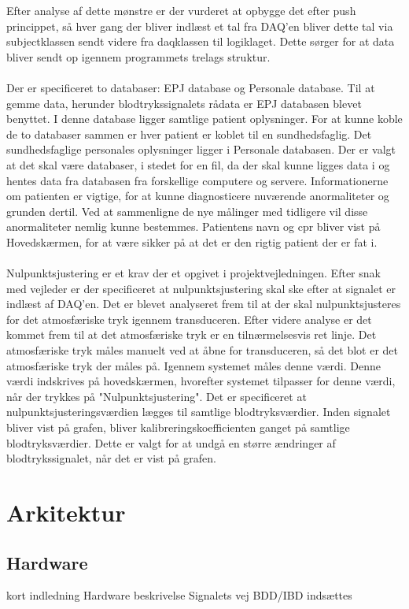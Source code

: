 Efter analyse af dette mønstre er der vurderet at opbygge det efter push princippet, så hver gang der bliver indlæst et tal fra DAQ’en bliver dette tal via subjectklassen sendt videre fra daqklassen til logiklaget. Dette sørger for at data bliver sendt op igennem programmets trelags struktur. \\\\
Der er specificeret to databaser: EPJ database og Personale database. Til at gemme data, herunder blodtrykssignalets rådata er EPJ databasen blevet benyttet. I denne database ligger samtlige patient oplysninger. For at kunne koble de to databaser sammen er hver patient er koblet til en sundhedsfaglig. Det sundhedsfaglige personales oplysninger ligger i Personale databasen. Der er valgt at det skal være databaser, i stedet for en fil, da der skal kunne ligges data i og hentes data fra databasen fra forskellige computere og servere. Informationerne om patienten er vigtige, for at kunne diagnosticere nuværende anormaliteter og grunden dertil. Ved at sammenligne de nye målinger med tidligere vil disse anormaliteter nemlig kunne bestemmes. Patientens navn og cpr bliver vist på Hovedskærmen, for at være sikker på at det er den rigtig patient der er fat i. \\\\
Nulpunktsjustering er et krav der et opgivet i projektvejledningen. Efter snak med vejleder er der specificeret at nulpunktsjustering skal ske efter at signalet er indlæst af DAQ’en. Det er blevet analyseret frem til at der skal nulpunktsjusteres for det atmosfæriske tryk igennem transduceren. Efter videre analyse er det kommet frem til at det atmosfæriske tryk er en tilnærmelsesvis ret linje. Det atmosfæriske tryk måles manuelt ved at åbne for transduceren, så det blot er det atmosfæriske tryk der måles på. Igennem systemet måles denne værdi. Denne værdi indskrives på hovedskærmen, hvorefter systemet tilpasser for denne værdi, når der trykkes på "Nulpunktsjustering". Det er specificeret at nulpunktsjusteringsværdien lægges til samtlige blodtryksværdier. Inden signalet bliver vist på grafen, bliver kalibreringskoefficienten ganget på samtlige blodtryksværdier. Dette er valgt for at undgå en større ændringer af blodtrykssignalet, når det er vist på grafen.  

	\section{Arkitektur}
	\subsection{Hardware}
	kort indledning
	Hardware beskrivelse
	Signalets vej
	BDD/IBD indsættes
